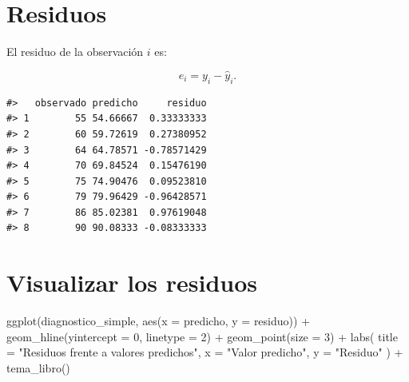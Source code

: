 \documentclass[
  spanish,
  10.5pt,
  letterpaper,
  openany,
  headings=big]{scrbook}
\newenvironment{Shaded}{}{}
\newcommand{\AttributeTok}[1]{\textcolor[rgb]{0.84,0.23,0.29}{#1}}
\newcommand{\DecValTok}[1]{\textcolor[rgb]{0.00,0.36,0.77}{#1}}
\newcommand{\FunctionTok}[1]{\textcolor[rgb]{0.44,0.26,0.76}{#1}}
\newcommand{\NormalTok}[1]{\textcolor[rgb]{0.14,0.16,0.18}{#1}}
\newcommand{\OtherTok}[1]{\textcolor[rgb]{0.44,0.26,0.76}{#1}}
\newcommand{\SpecialCharTok}[1]{\textcolor[rgb]{0.00,0.36,0.77}{#1}}
\newcommand{\StringTok}[1]{\textcolor[rgb]{0.01,0.18,0.38}{#1}}
\begin{document}
\section{Residuos}\label{residuos}

El residuo de la observación \(i\) es:

\[
e_i = y_i - \widehat{y}_i.
\]

\begin{Shaded}
\end{Shaded}

\begin{verbatim}
#>   observado predicho     residuo
#> 1        55 54.66667  0.33333333
#> 2        60 59.72619  0.27380952
#> 3        64 64.78571 -0.78571429
#> 4        70 69.84524  0.15476190
#> 5        75 74.90476  0.09523810
#> 6        79 79.96429 -0.96428571
#> 7        86 85.02381  0.97619048
#> 8        90 90.08333 -0.08333333
\end{verbatim}

\section{Visualizar los residuos}\label{visualizar-los-residuos}

\begin{Shaded}
\begin{Highlighting}[]
\FunctionTok{ggplot}\NormalTok{(diagnostico\_simple, }\FunctionTok{aes}\NormalTok{(}\AttributeTok{x =}\NormalTok{ predicho, }\AttributeTok{y =}\NormalTok{ residuo)) }\SpecialCharTok{+}
  \FunctionTok{geom\_hline}\NormalTok{(}\AttributeTok{yintercept =} \DecValTok{0}\NormalTok{, }\AttributeTok{linetype =} \DecValTok{2}\NormalTok{) }\SpecialCharTok{+}
  \FunctionTok{geom\_point}\NormalTok{(}\AttributeTok{size =} \DecValTok{3}\NormalTok{) }\SpecialCharTok{+}
  \FunctionTok{labs}\NormalTok{(}
    \AttributeTok{title =} \StringTok{"Residuos frente a valores predichos"}\NormalTok{,}
    \AttributeTok{x =} \StringTok{"Valor predicho"}\NormalTok{,}
    \AttributeTok{y =} \StringTok{"Residuo"}
\NormalTok{  ) }\SpecialCharTok{+}
  \FunctionTok{tema\_libro}\NormalTok{()}
\end{Highlighting}
\end{Shaded}
\end{document}
